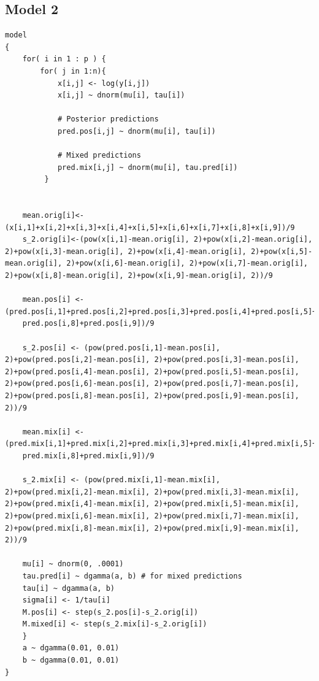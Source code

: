 \documentclass{article}
\begin{document}
\subsection*{Model 2}
\begin{lstlisting}
model
{
	for( i in 1 : p ) {
		for( j in 1:n){
			x[i,j] <- log(y[i,j])
			x[i,j] ~ dnorm(mu[i], tau[i])
			
			# Posterior predictions
			pred.pos[i,j] ~ dnorm(mu[i], tau[i])
			
			# Mixed predictions
			pred.mix[i,j] ~ dnorm(mu[i], tau.pred[i])
    	 }


	mean.orig[i]<- (x[i,1]+x[i,2]+x[i,3]+x[i,4]+x[i,5]+x[i,6]+x[i,7]+x[i,8]+x[i,9])/9
	s_2.orig[i]<-(pow(x[i,1]-mean.orig[i], 2)+pow(x[i,2]-mean.orig[i], 2)+pow(x[i,3]-mean.orig[i], 2)+pow(x[i,4]-mean.orig[i], 2)+pow(x[i,5]-mean.orig[i], 2)+pow(x[i,6]-mean.orig[i], 2)+pow(x[i,7]-mean.orig[i], 2)+pow(x[i,8]-mean.orig[i], 2)+pow(x[i,9]-mean.orig[i], 2))/9
	
	mean.pos[i] <- (pred.pos[i,1]+pred.pos[i,2]+pred.pos[i,3]+pred.pos[i,4]+pred.pos[i,5]+pred.pos[i,6]+pred.pos[i,7]+
	pred.pos[i,8]+pred.pos[i,9])/9
	
	s_2.pos[i] <- (pow(pred.pos[i,1]-mean.pos[i], 2)+pow(pred.pos[i,2]-mean.pos[i], 2)+pow(pred.pos[i,3]-mean.pos[i], 2)+pow(pred.pos[i,4]-mean.pos[i], 2)+pow(pred.pos[i,5]-mean.pos[i], 2)+pow(pred.pos[i,6]-mean.pos[i], 2)+pow(pred.pos[i,7]-mean.pos[i], 2)+pow(pred.pos[i,8]-mean.pos[i], 2)+pow(pred.pos[i,9]-mean.pos[i], 2))/9
	
	mean.mix[i] <- (pred.mix[i,1]+pred.mix[i,2]+pred.mix[i,3]+pred.mix[i,4]+pred.mix[i,5]+pred.mix[i,6]+pred.mix[i,7]+
	pred.mix[i,8]+pred.mix[i,9])/9
	
	s_2.mix[i] <- (pow(pred.mix[i,1]-mean.mix[i], 2)+pow(pred.mix[i,2]-mean.mix[i], 2)+pow(pred.mix[i,3]-mean.mix[i], 2)+pow(pred.mix[i,4]-mean.mix[i], 2)+pow(pred.mix[i,5]-mean.mix[i], 2)+pow(pred.mix[i,6]-mean.mix[i], 2)+pow(pred.mix[i,7]-mean.mix[i], 2)+pow(pred.mix[i,8]-mean.mix[i], 2)+pow(pred.mix[i,9]-mean.mix[i], 2))/9
	
	mu[i] ~ dnorm(0, .0001)
	tau.pred[i] ~ dgamma(a, b) # for mixed predictions
	tau[i] ~ dgamma(a, b)
	sigma[i] <- 1/tau[i]
	M.pos[i] <- step(s_2.pos[i]-s_2.orig[i])
	M.mixed[i] <- step(s_2.mix[i]-s_2.orig[i])
	}
	a ~ dgamma(0.01, 0.01)
	b ~ dgamma(0.01, 0.01)
}
\end{lstlisting}
\end{document}
